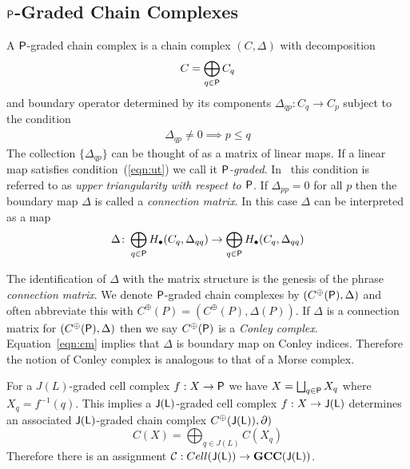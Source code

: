 %
%


\subsection{${\mathsf P}$-Graded Chain Complexes}


A ${\mathsf P}$-graded chain complex is a chain complex $(C,\Delta)$ with decomposition $$C=\bigoplus_{q\in {\mathsf P}} C_q$$ and boundary operator determined by its components $\Delta_{qp}:C_q\to C_p$ subject to the condition 
\begin{align}\label{eqn:ut}
\Delta_{qp}\neq 0\implies p\leq q
\end{align}  The collection $\{\Delta_{qp}\}$ can be thought of as a matrix of linear maps. If a linear map satisfies condition~(\ref{eqn:ut}) we call it {\em ${\mathsf P}$-graded}.  In~\cite{fran} this condition is referred to as {\em upper triangularity with respect to ${\mathsf P}$}.   If $\Delta_{pp} = 0$ for all $p$ then the boundary map $\Delta$ is called a {\em connection matrix}.  In this case $\Delta$ can be interpreted as a map
\begin{align}\label{eqn:cm}
\Delta \colon \bigoplus_{q\in {\mathsf P}} H_\bullet(C_q,\Delta_{qq})\to \bigoplus_{q\in {\mathsf P}} H_\bullet(C_q,\Delta_{qq})
\end{align}

The identification of $\Delta$ with the matrix structure is the genesis of the phrase {\em connection matrix}.  We denote ${\mathsf P}$-graded chain complexes by $(C^\oplus({\mathsf P}),\Delta)$ and often abbreviate this with $C^\oplus(P)=(C^\oplus(P),\Delta(P))$.  If $\Delta$ is a connection matrix for $(C^\oplus({\mathsf P}),\Delta)$ then we say $C^\oplus({\mathsf P})$ is a {\em Conley complex}.  Equation~\ref{eqn:cm} implies that $\Delta$ is boundary map on Conley indices.  Therefore the notion of Conley complex is analogous to that of a Morse complex.


\begin{ex}
For a $J(L)$-graded cell complex $f:X\to {\mathsf P}$ we have $X=\bigsqcup_{q\in {\mathsf P}} X_q$ where $X_q=f^{-1}(q)$.   This implies a ${\mathsf J}({\mathsf L})$-graded cell complex $f:X\to {\mathsf J}({\mathsf L})$ determines an associated ${\mathsf J}({\mathsf L})$-graded chain complex $C^\oplus({\mathsf J}({\mathsf L})),\partial)$ 
\[
C(X) = \bigoplus_{q\in J(L)} C(X_q)
\]
Therefore there is an assignment ${\mathcal C}:Cell({\mathsf J}({\mathsf L}))\to {\bf GCC}({\mathsf J}({\mathsf L}))$. 
\end{ex}

